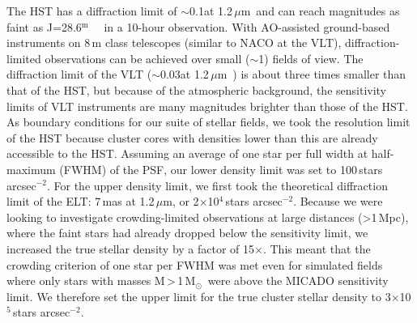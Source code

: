 \documentclass[referee]{aa}
\newcommand{\m}{$^\mathrm{m}$~}
\newcommand{\um}{$\mu$m~}
\newcommand{\ume}{$\mu$m}
\newcommand{\msun}{M$_\odot$~}
\newcommand{\s}{$\sim$}
\newcommand{\h}[1]{$^{#1}$}
\newcommand{\spae}{stars arcsec$^{-2}$}
\begin{document}
The HST has a diffraction limit of \s0.1\arcsec at 1.2\,\um and can reach magnitudes as faint as J=28.6\m~\citep{hst_wfc3} in a 10-hour observation.
With AO-assisted ground-based instruments on 8\,m class telescopes (similar to NACO at the VLT), diffraction-limited observations can be achieved over small (\s1\arcmin) fields of view.
The diffraction limit of the VLT (\s0.03\arcsec at 1.2\,\um) is about three times smaller than that of the HST, but because of the atmospheric background, the sensitivity limits of VLT instruments are many magnitudes brighter than those of the HST\@.
As boundary conditions for our suite of stellar fields, we took the resolution limit of the HST because cluster cores with densities lower than this are already accessible to the HST\@.
Assuming an average of one star per full width at half-maximum (FWHM) of the PSF, our lower density limit was set to 100\,\spae.
For the upper density limit, we first took the theoretical diffraction limit of the ELT: 7\,mas at 1.2\,\ume, or 2$\times$10\h4\,\spae.
Because we were looking to investigate crowding-limited observations at large distances (\textgreater1\,Mpc), where the faint stars had already dropped below the sensitivity limit, we increased the true stellar density by a factor of 15$\times$.
This meant that the crowding criterion of one star per FWHM was met even for simulated fields where only stars with masses M\,\textgreater\,1\,\msun were above the MICADO sensitivity limit.
We therefore set the upper limit for the true cluster stellar density to 3$\times$10\h5\,\spae.
\end{document}

